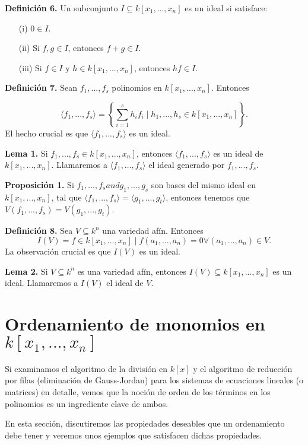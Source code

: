 \textbf{Definición 6.} Un subconjunto $I \subseteq k[x_{1},...,x_{n}]$ es un ideal si satisface:
\begin{enumerate}
	\item [(i)]  $0 \in I.$
	\item [(ii)] Si $f,g \in I$, entonces $f + g \in I.$
	\item [(iii)] Si $f \in I$ y $h \in k[x_{1},...,x_{n}]$, entonces $hf \in I$.
\end{enumerate}

\textbf{Definición 7.} Sean $f_{1},...,f_{s}$ polinomios en $k[x_{1},...,x_{n}]$. Entonces

\[
\langle f_{1},...,f_{s}\rangle = \left\lbrace \sum_{i=1}^{s}h_{i}f_{i} \mid h_{1},...,h_{s} \in k[x_{1},...,x_{n}]\right\rbrace .
\]
El hecho crucial es que $\langle f_{1},...,f_{s}\rangle$ es un ideal.

\textbf{Lema 1.} Si $f_{1},...,f_{s} \in k[x_{1},...,x_{n}]$, entonces $\langle f_{1},...,f_{s}\rangle$ es un ideal de $k[x_{1},...,x_{n}]$.
Llamaremos a $\langle f_{1},...,f_{s}\rangle$ el ideal generado por $f_{1},...,f_{s}$.

\textbf{Proposición 1.} Si $f_{1},...,f_{s} and g_{1},...,g_{s}$ son bases del mismo ideal en $k[x_{1},...,x_{n}]$, tal que $\langle f_{1},...,f_{s}\rangle = \langle g_{1},...,g_{t}\rangle$, entonces tenemos que $V(f_{1},...,f_{s}) = V(g_{1},...,g_{t})$.

\textbf{Definición 8.} Sea $V \subseteq k^{n}$ una variedad afín. Entonces
\[
I(V) = {f \in k[x_{1},...,x_{n}] \mid f(a_{1},...,a_{n}) = 0 \forall (a_{1},...,a_{n}) \in V}.
\]
La observación crucial es que $I(V)$ es un ideal.

\textbf{Lema 2.} Si $V \subseteq k^{n}$ es una variedad afín, entonces $I(V) \subseteq k[x_{1},...,x_{n}]$ es un ideal. Llamaremos a $I(V)$ el ideal de $V$.

\section{Ordenamiento de monomios en $k[x_{1},...,x_{n}]$}

Si examinamos el algoritmo de la división en $k[x]$ y el algoritmo de reducción por filas (eliminación de Gauss-Jordan) para los sistemas de ecuaciones lineales (o matrices) en detalle, vemos que la noción de orden de los términos en los polinomios es un ingrediente clave de ambos. 

En esta sección, discutiremos las propiedades deseables que un ordenamiento debe tener y veremos unos ejemplos que satisfacen dichas propiedades.

